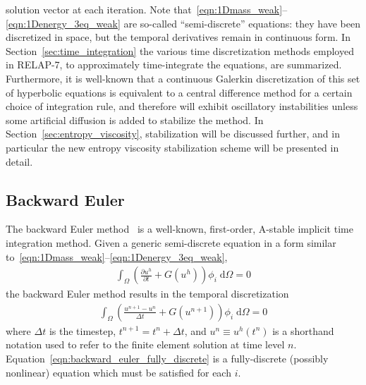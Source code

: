 solution vector at each iteration.  Note
that~\eqref{eqn:1Dmass_weak}--\eqref{eqn:1Denergy_3eq_weak} are
so-called ``semi-discrete'' equations: they have been discretized in
space, but the temporal derivatives remain in continuous form.  In
Section~\ref{sec:time_integration} the various time discretization methods
employed in RELAP-7, to approximately time-integrate the equations,
are summarized.  Furthermore, it is well-known
that a continuous Galerkin discretization of this set of hyperbolic
equations is equivalent to a central difference method for a certain
choice of integration rule, and therefore will exhibit oscillatory
instabilities unless some artificial diffusion is added to stabilize
the method.  In Section~\ref{sec:entropy_viscosity}, stabilization will be
discussed further, and in particular the new entropy viscosity 
stabilization scheme will be presented in detail.
%
\subsection{Backward Euler\label{sec:backward_euler}}
%
The backward Euler method~\cite{Butcher_2003} is a well-known, first-order, A-stable
implicit time integration method.  Given a generic
semi-discrete equation in a form similar to~\eqref{eqn:1Dmass_weak}--\eqref{eqn:1Denergy_3eq_weak},
\begin{align}
  \int_{\Omega} \left(\frac{\partial u^h}{\partial t} + G(u^h) \right) \phi_i \; \text{d}{\Omega} = 0
\end{align}
the backward Euler method results in the temporal discretization
\begin{align}
  \label{eqn:backward_euler_fully_discrete}
  \int_{\Omega} \left( \frac{u^{n+1} - u^n}{\Delta t} + G(u^{n+1}) \right) \phi_i \; \text{d}{\Omega} = 0
\end{align}
where $\Delta t$ is the timestep, $t^{n+1} = t^n + \Delta t$, and $u^n
\equiv u^h(t^n)$ is a shorthand notation used to refer to the finite
element solution at time level
$n$. Equation~\eqref{eqn:backward_euler_fully_discrete} is a
fully-discrete (possibly nonlinear) equation which must be satisfied
for each $i$.

